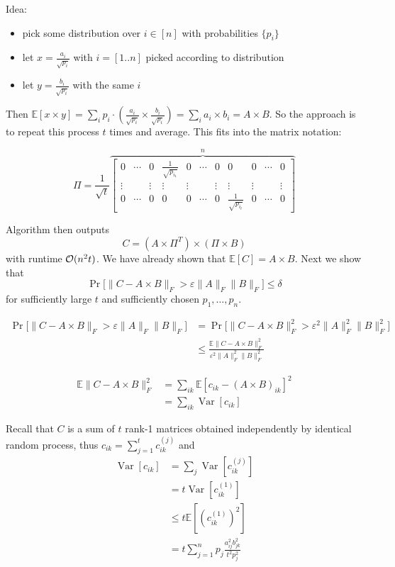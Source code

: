 \documentclass[11pt]{article}
\newcommand{\E}{{\mathbb E}}
\DeclareMathOperator{\var}{Var}
\begin{document}
Idea: 
\begin{itemize}
\item pick some distribution over $i \in [n]$ with probabilities $\{p_i\}$
\item let $x = \frac{a_i}{\sqrt{p_i}}$ with $i = [1..n]$ picked according to distribution
\item let $y = \frac{b_i}{\sqrt{p_i}}$ with the same $i$
\end{itemize}
 Then $\E[x \times y] = \sum_i p_i \cdot( \frac{a_i}{\sqrt{p_i}} \times \frac{b_i}{\sqrt{p_i}}) = \sum_i a_i \times b_i = A \times B$. So the approach is to repeat this process $t$ times and average. This fits into the matrix notation:
 
 $$\Pi = \frac{1}{\sqrt{t}} 
 \overbrace{
 \begin{bmatrix} 
 0 & \cdots & 0 & \frac{1}{\sqrt{p_{i_1}}} & 0 & \cdots  & 0 & 0 & 0 & \cdots & 0 \\
 \vdots & & \vdots & \vdots & \vdots & & \vdots & \vdots & \vdots & & \vdots \\
 0 & \cdots & 0 & 0 & 0 & \cdots  & 0 &  \frac{1}{\sqrt{p_{i_t}}} & 0 & \cdots & 0
 \end{bmatrix} 
 }^{n}$$
 
 Algorithm then outputs
 $$ C = (A \times \Pi^T) \times (\Pi \times B)$$
 with runtime $\mathcal{O}(n^2t)$.
 We have already shown that $\E[C] = A \times B$. Next we show that
 $$\Pr\Big[\| C - A \times B\|_F > \varepsilon \|A\|_F \|B\|_F\Big] \le \delta$$
 for sufficiently large $t$ and sufficiently chosen $p_1,\ldots,p_n$.
 
\begin{align*}
\Pr\Big[\| C - A \times B\|_F > \varepsilon \|A\|_F \|B\|_F\Big] &= \Pr\Big[\| C - A \times B\|_F^2 > \varepsilon^2 \|A\|_F^2 \|B\|_F^2\Big]\\
&\le \frac{\E \| C - A \times B\|_F^2}{ \varepsilon^2 \|A\|_F^2 \|B\|_F^2 }
\end{align*}

\begin{align*}
\E \| C - A \times B\|_F^2 &= \sum_{ik} \E[c_{ik} - (A \times B)_{ik}]^2\\
&= \sum_{ik} \var[c_{ik}]
\end{align*}


Recall that $C$ is a sum of $t$ rank-1 matrices obtained independently by identical random process, thus
$c_{ik} = \sum_{j=1}^t c_{ik}^{(j)}$ and
\begin{align*}
\var[c_{ik}] &= \sum_{j} \var[c^{(j)}_{ik}]\\
 &= t \var[c^{(1)}_{ik}]\\
 &\le t \E[(c^{(1)}_{ik})^2] \\
 &= t\sum_{j=1}^n p_j \frac{a_{ij}^2 b_{jk}^2}{t^2 p^2_j}
\end{align*}
\end{document}
